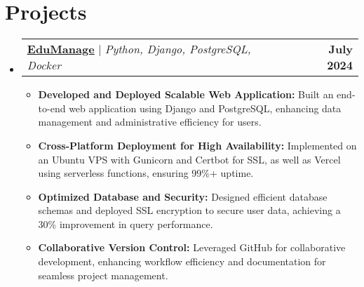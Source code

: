 \documentclass[a4paper,11pt]{article}
\makeatletter
\newcommand{\resumeItem}[1]{
	\item\small{#1 \vspace{-2pt}}
}
\newcommand{\resumeProjectHeading}[2]{
		\item
		\begin{tabular*}{0.97\textwidth}{l@{\extracolsep{\fill}}r}
			\small#1 & \textbf{\small #2} \\
		\end{tabular*}\vspace{-7pt}
}
\newcommand{\resumeSubHeadingListStart}{\begin{itemize}[leftmargin=0.15in, label={}]}
\newcommand{\resumeSubHeadingListEnd}{\end{itemize}}
\newcommand{\resumeItemListStart}{\begin{itemize}}
\newcommand{\resumeItemListEnd}{\end{itemize}\vspace{-5pt}}
\makeatother
\begin{document}
\section{Projects}
\resumeSubHeadingListStart
\resumeProjectHeading
{\textbf{\href{https://github.com/ajmalbuv/EduManage}{\underline{EduManage}}} $|$ \emph{Python, Django, PostgreSQL, Docker}}{July 2024}
\resumeItemListStart
\resumeItem{\textbf{Developed and Deployed Scalable Web Application:} Built an end-to-end web application using Django and PostgreSQL, enhancing data management and administrative efficiency for users.}
\resumeItem{\textbf{Cross-Platform Deployment for High Availability:} Implemented on an Ubuntu VPS with Gunicorn and Certbot for SSL, as well as Vercel using serverless functions, ensuring 99\%+ uptime.}
\resumeItem{\textbf{Optimized Database and Security:} Designed efficient database schemas and deployed SSL encryption to secure user data, achieving a 30\% improvement in query performance.}
\resumeItem{\textbf{Collaborative Version Control:} Leveraged GitHub for collaborative development, enhancing workflow efficiency and documentation for seamless project management.}
\resumeItemListEnd
\resumeSubHeadingListEnd

\end{document}

